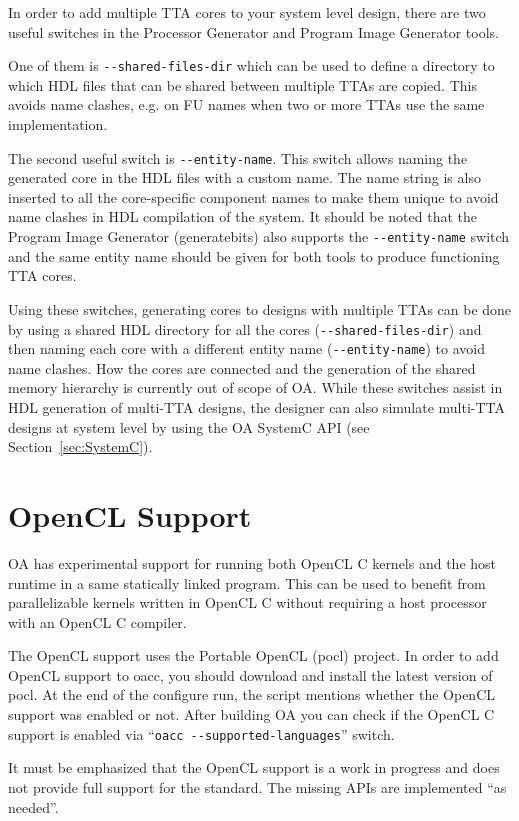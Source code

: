 \documentclass[a4paper,twoside]{tceusermanual}
\begin{document}
In order to add multiple TTA cores to your system level design, there are
two useful switches in the Processor Generator and Program Image Generator 
tools. 

One of them is \verb|--shared-files-dir| which can be used to define 
a directory to which HDL files that can be shared between multiple TTAs are 
copied. This avoids name clashes, e.g. on FU names when two or more TTAs 
use the same implementation. 

The second useful switch is \verb|--entity-name|. This switch allows
naming the generated core in the HDL files with a custom name. The name 
string is also inserted to all the core-specific component names to make
them unique to avoid name clashes in HDL compilation of the system. It
should be noted that the Program Image Generator (generatebits) also
supports the \verb|--entity-name| switch and the same entity name should
be given for both tools to produce functioning TTA cores.

Using these switches, generating cores to designs with multiple TTAs can
be done by using a shared HDL directory for all the cores (\verb|--shared-files-dir|) 
and then naming each core with a different entity name (\verb|--entity-name|) to 
avoid name clashes. How the cores are connected and the generation of
the shared memory hierarchy is currently out of scope of OA. While
these switches assist in HDL generation of multi-TTA designs, the
designer can also simulate multi-TTA designs at system level by
using the OA SystemC API (see Section~\ref{sec:SystemC}).

\section{OpenCL Support}

OA has experimental support for running both OpenCL C kernels and the host 
runtime in a same statically linked program. This can be used to benefit from
parallelizable kernels written in OpenCL C without requiring a host processor 
with an OpenCL C compiler.

The OpenCL support uses the {Portable OpenCL (pocl)} project. In order to
add OpenCL support to oacc, you should download and install the latest version of
pocl. At the end of the configure run, the script 
mentions whether the OpenCL support was enabled or not. After building OA
you can check if the OpenCL C support is enabled via ``\verb|oacc --supported-languages|''
switch.

It must be emphasized that the OpenCL support is a work in progress and
does not provide full support for the standard. The missing APIs are
implemented ``as needed''.
\end{document}
